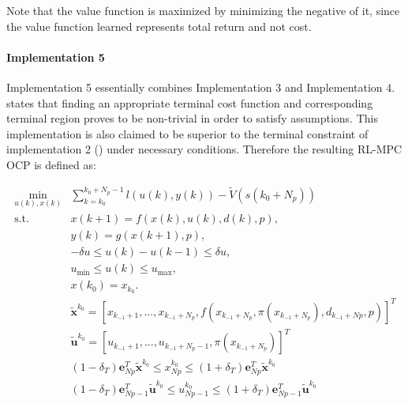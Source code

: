  Note that the value function is maximized by minimizing the negative of it, since the value function learned represents total return and not cost.

\paragraph{Implementation 5}
Implementation 5 essentially combines Implementation 3 and Implementation 4. \cite{amritEconomicOptimizationUsing2011} states that finding an appropriate terminal cost function and corresponding terminal region proves to be non-trivial in order to satisfy assumptions. This implementation is also claimed to be superior to the terminal constraint of implementation 2 (\cite{amritEconomicOptimizationUsing2011}) under necessary conditions. Therefore the resulting RL-MPC OCP is defined as:

\begin{subequations} \label{eq:rl-mpc-ocp}
	\begin{align}
		\min_{u(k),x(k)} & \sum_{k = k_0}^{k_0 + N_p-1} {l(u(k), y(k))} - \tilde{V}(s(k_0+N_p)) \\
		\text{s.t.} \quad & x(k+1) = f(x(k), u(k), d(k), p),  \label{eq:rl-mpc-dynamics-constraint} \\
		& y(k) = g(x(k+1), p), \label{eq:rl-mpc-output-constraint} \\
		& -\delta u \leq u(k) - u(k-1) \leq \delta u, \label{eq:rl-mpc-delta-u} \\
		& u_{\min} \leq u(k) \leq u_{\max}, \label{eq:rl-mpc-u-limits}\\
		& x(k_0) = x_{k_0}. \label{eq:rl-pmc-initial} \\
		&\tilde{\mathbf{x}}^{k_0} = [x_{k_{-1} + 1},...,x_{k_{-1} + N_p}, f(x_{k_{-1} + N_p}, \pi(x_{k_{-1} + N_p}), d_{k_{-1} + Np},p)]^T \\ 
		&\tilde{\mathbf{u}}^{k_{0}} = [u_{k_{-1} + 1},...,u_{k_{-1} + N_p - 1}, \pi(x_{k_{-1} + N_p})]^T \\ 
		& (1-\delta_T)\mathbf{e}_{Np}^T \tilde{\mathbf{x}}^{k_0} \leq x^{k_0}_{Np} \leq (1+\delta_T)\mathbf{e}_{Np}^T \tilde{\mathbf{x}}^{k_0}\\
		&(1-\delta_T)\mathbf{e}_{Np-1}^T\tilde{\mathbf{u}}^{k_0} \leq u^{k_0}_{Np-1} \leq (1+\delta_T) \mathbf{e}_{Np-1}^T\tilde{\mathbf{u}}^{k_0}\\
	\end{align}
\end{subequations}



